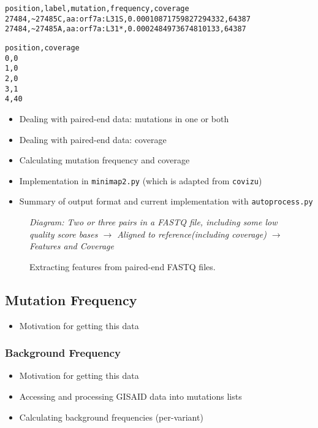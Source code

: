 \documentclass{article}
\newenvironment{tightemize}
{ \begin{itemize}
    \setlength{\itemsep}{0pt}
    \setlength{\parskip}{0pt}
    \setlength{\parsep}{0pt}     }
{ \end{itemize}                  }
\begin{document}
\begin{verbatim}
position,label,mutation,frequency,coverage
27484,~27485C,aa:orf7a:L31S,0.00010871759827294332,64387
27484,~27485A,aa:orf7a:L31*,0.0002484973674810133,64387
\end{verbatim}

\begin{verbatim}
position,coverage
0,0
1,0
2,0
3,1
4,40
\end{verbatim}


\begin{tightemize}
    \item Dealing with paired-end data: mutations in one or both
    \item Dealing with paired-end data: coverage
    \item Calculating mutation frequency and coverage
    \item Implementation in \texttt{minimap2.py} (which is adapted from \texttt{covizu})
    \item Summary of output format and current implementation with \texttt{autoprocess.py}
\end{tightemize}

\begin{figure}[ht!]
\vspace{2cm}
\centering
\emph{Diagram: Two or three pairs in a FASTQ file, including some low quality score bases $\rightarrow$ Aligned to reference(including coverage) $\rightarrow$ Features and Coverage}
\vspace{2cm}
\caption{Extracting features from paired-end FASTQ files.}
\label{fig:feature_diagram}
\end{figure}

\subsection{Mutation Frequency}


\begin{tightemize}
    \item Motivation for getting this data
\end{tightemize}

\subsubsection{Background Frequency}
\begin{tightemize}
    \item Motivation for getting this data
    \item Accessing and processing GISAID data into mutations lists
    \item Calculating background frequencies (per-variant)
\end{tightemize}
\end{document}
